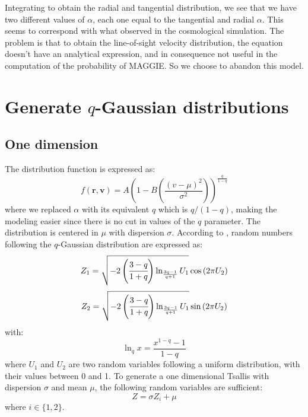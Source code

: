 Integrating to obtain the radial and tangential distribution, we see that we
have two different values of $\alpha$, each one equal to the tangential and
radial $\alpha$. This seems to correspond with what observed in the
cosmological simulation. The problem is that to obtain the line-of-sight
velocity distribution, the equation doesn't have an analytical expression,
and in consequence not useful in the computation of the probability of
MAGGIE\@. So we choose to abandon this model.

\section{Generate $q$-Gaussian distributions}
\label{sec:generate_q_gaussian_distributions}

\subsection{One dimension}
\label{sub:one_dimension}

The distribution function is expressed as:
%
\begin{equation}
    f\left(\textbf{r},\textbf{v}\right)=
    A{\left(
        1-B\left(\frac{{\left(v-\mu\right)}^2}{\sigma^2}\right)
    \right)}^{\frac{q}{1-q}}
\end{equation}
%
where we replaced $\alpha$ with its equivalent $q$ which is
$q/\left(1-q\right)$, making the modeling easier since there is no cut in
values of the $q$ parameter. The distribution is centered in $\mu$ with
dispersion $\sigma$. According to \citet{Thistleton+06}, random numbers
following the $q$-Gaussian distribution are expressed as:
%
\begin{equation}
    Z_1=\sqrt{-2\left(\cfrac{3-q}{1+q}\right)\ln_{\frac{3q-1}{q+1}}U_1}
    \cos\left(2\pi U_2\right)
\end{equation}
%
\begin{equation}
    Z_2=\sqrt{-2\left(\cfrac{3-q}{1+q}\right)\ln_{\frac{3q-1}{q+1}}U_1}
    \sin\left(2\pi U_2\right)
\end{equation}
%
with:
%
\begin{equation}
    \ln_q x=\frac{x^{1-q}-1}{1-q}
\end{equation}
%
where $U_1$ and $U_2$ are two random variables following a uniform
distribution, with their values between 0 and 1. To generate a one
dimensional Tsallis with dispersion $\sigma$ and mean $\mu$, the following
random variables are sufficient:
%
\begin{equation}
    Z = \sigma Z_i + \mu
\end{equation}
%
where $i\in \{1,2 \}$.

